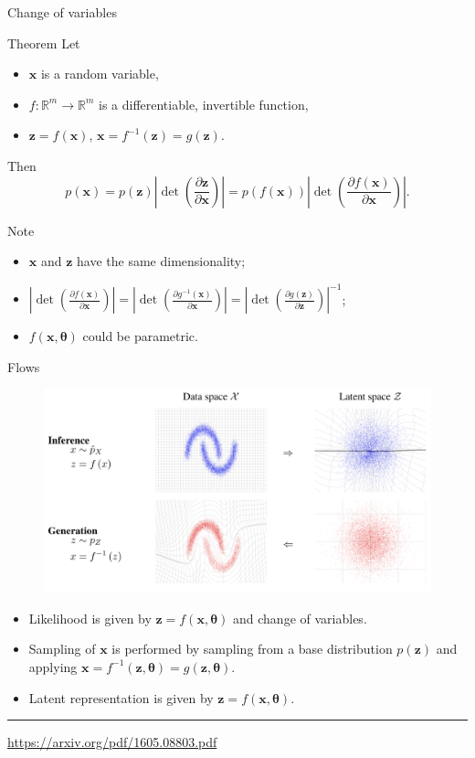 \documentclass{beamer}
\newcommand{\bx}{\mathbf{x}}
\newcommand{\bz}{\mathbf{z}}
\newcommand{\btheta}{\boldsymbol{\theta}}
\begin{document}
\begin{frame}{Change of variables}
	\begin{block}{Theorem}
		Let 
		\begin{itemize}
			\item $\bx$ is a random variable, 
			\item $f: \mathbb{R}^m \rightarrow \mathbb{R}^m$ is a differentiable, invertible function,
			\item $\bz = f(\bx)$, $\bx = f^{-1}(\bz) = g(\bz)$.
		\end{itemize}
		Then
		\[
		p(\bx) = p(\bz) \left|\det \left(  \frac{\partial \bz}{\partial \bx} \right) \right| = p(f(\bx)) \left|\det \left(  \frac{\partial f(\bx)}{\partial \bx} \right) \right|.
		\]
	\end{block}
	\begin{block}{Note}
		\begin{itemize}
			\item $\bx$ and $\bz$ have the same dimensionality;
			\item $ \left|\det \left(  \frac{\partial f(\bx)}{\partial \bx} \right)\right| = \left|\det \left(  \frac{\partial g^{-1}(\bx)}{\partial \bx} \right)\right| = \left|\det \left(  \frac{\partial g(\bz)}{\partial \bz} \right)\right|^{-1}$;
			\item $f(\bx, \btheta)$ could be parametric.
		\end{itemize}
	\end{block}
\end{frame}
\begin{frame}{Flows}
\begin{figure}
	\includegraphics[width=0.8\linewidth]{figs/flows_how2.png}
\end{figure}
\begin{itemize}
	\item Likelihood is given by $\bz = f(\bx, \btheta)$ and change of variables.
	\item Sampling of $\bx$ is performed by sampling from a base distribution $p(\bz)$ and applying $\bx = f^{-1}(\bz, \btheta) = g(\bz, \btheta)$.
	\item Latent representation is given by $\bz = f(\bx, \btheta)$.
\end{itemize}
\vfill
\hrule\medskip
{\scriptsize \href{https://arxiv.org/pdf/1605.08803.pdf}{https://arxiv.org/pdf/1605.08803.pdf}} 
\end{frame}
\end{document}
